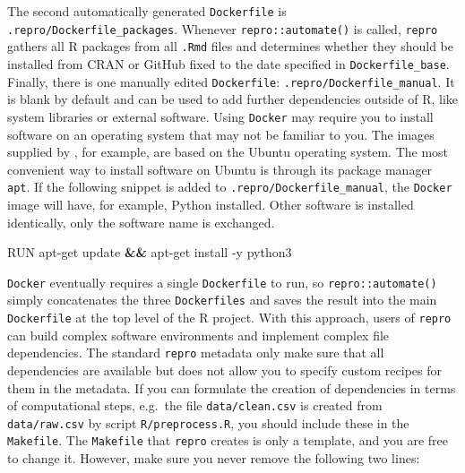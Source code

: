 \documentclass[psych,tutorial,accept,moreauthors,pdftex]{Definitions/mdpi}
\newenvironment{Shaded}{\begin{snugshade}}{\end{snugshade}}
\newcommand{\AttributeTok}[1]{\textcolor[rgb]{0.77,0.63,0.00}{#1}}
\newcommand{\ExtensionTok}[1]{#1}
\newcommand{\KeywordTok}[1]{\textcolor[rgb]{0.13,0.29,0.53}{\textbf{#1}}}
\newcommand{\NormalTok}[1]{#1}
\begin{document}
\begin{paracol}{2}
The second automatically generated \texttt{Dockerfile} is
\texttt{.repro/Dockerfile\_packages}. Whenever
\texttt{repro::automate()} is called, \texttt{repro} gathers all R
packages from all \texttt{.Rmd} files and determines whether they should
be installed from CRAN or GitHub fixed to the date specified in
\texttt{Dockerfile\_base}. Finally, there is one manually edited
\texttt{Dockerfile}: \texttt{.repro/Dockerfile\_manual}. It is blank by
default and can be used to add further dependencies outside of R, like
system libraries or external software. Using \texttt{Docker} may require
you to install software on an operating system that may not be familiar
to you. The images supplied by
\citep{boettigerIntroductionRockerDocker2017}, for example, are based on
the Ubuntu operating system. The most convenient way to install software
on Ubuntu is through its package manager \texttt{apt}. If the following
snippet is added to \texttt{.repro/Dockerfile\_manual}, the
\texttt{Docker} image will have, for example, Python installed. Other
software is installed identically, only the software name is exchanged.

\begin{adjustwidth}{0.5cm}{0cm} 
\begin{Shaded}
\begin{Highlighting}[]
\ExtensionTok{RUN}\NormalTok{ apt{-}get update }\KeywordTok{\&\&} \ExtensionTok{apt{-}get}\NormalTok{ install }\AttributeTok{{-}y}\NormalTok{ python3}
\end{Highlighting}
\end{Shaded}
\end{adjustwidth}


\texttt{Docker} eventually requires a single \texttt{Dockerfile} to run,
so \texttt{repro::automate()} simply concatenates the three
\texttt{Dockerfiles} and saves the result into the main
\texttt{Dockerfile} at the top level of the R project. With this
approach, users of \texttt{repro} can build complex software
environments and implement complex file dependencies. The standard
\texttt{repro} metadata only make sure that all dependencies are
available but does not allow you to specify custom recipes for them in
the metadata. If you can formulate the creation of dependencies in terms
of computational steps, e.g.~the file \texttt{data/clean.csv} is created
from \texttt{data/raw.csv} by script \texttt{R/preprocess.R}, you should
include these in the \texttt{Makefile}. The \texttt{Makefile} that
\texttt{repro} creates is only a template, and you are free to change
it. However, make sure you never remove the following two lines:


\end{paracol}
\end{document}
